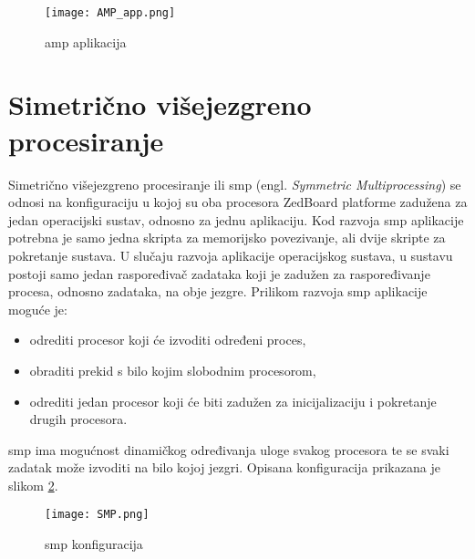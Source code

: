 \documentclass[times, utf8, diplomski, numeric]{fer}
\begin{document}
\begin{figure}[H]
  \centering
	\texttt{[image: AMP\_app.png]}%
	\caption{\gls{amp} aplikacija}
	\label{amp_app}%
\end{figure}

\section{Simetrično višejezgreno procesiranje}
Simetrično višejezgreno procesiranje ili \gls{smp} (engl. \textit{Symmetric Multiprocessing}) se odnosi na
konfiguraciju u kojoj su oba procesora ZedBoard platforme zadužena za jedan operacijski sustav, odnosno
za jednu aplikaciju. Kod razvoja \gls{smp} aplikacije potrebna je samo jedna skripta za memorijsko povezivanje, ali
dvije skripte za pokretanje sustava. U slučaju razvoja aplikacije operacijskog sustava, u sustavu postoji
samo jedan raspoređivač zadataka koji je zadužen za raspoređivanje procesa, odnosno zadataka, na obje jezgre.
Prilikom razvoja \gls{smp} aplikacije moguće je:
\begin{itemize}
  \item{odrediti procesor koji će izvoditi određeni proces,}
  \item{obraditi prekid s bilo kojim slobodnim procesorom,}
  \item{odrediti jedan procesor koji će biti zadužen za inicijalizaciju i pokretanje drugih procesora.}
\end{itemize}
\gls{smp} ima mogućnost dinamičkog određivanja uloge svakog procesora te se svaki zadatak može izvoditi na bilo kojoj jezgri.
Opisana konfiguracija prikazana je slikom \ref{smp}.
\begin{figure}[H]
  \centering
	\texttt{[image: SMP.png]}%
	\caption{\gls{smp} konfiguracija}
	\label{smp}%
\end{figure}
\end{document}
